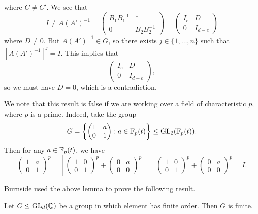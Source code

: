 \begin{pf}
   where $C \neq C'$. We see that 
   \[ I \neq A(A')^{-1} = \begin{pmatrix}
       B_1B_1^{-1} & * \\ 0 & B_2B_2^{-1} 
   \end{pmatrix} = \begin{pmatrix}
       I_e & D \\ 0 & I_{d-e}
   \end{pmatrix} \] 
   where $D \neq 0$. But $A(A')^{-1} \in G$, so there exists $j \in \{1, \dots, n\}$ 
   such that $[A(A')^{-1}]^j = I$. This implies that 
   \[ \begin{pmatrix}
       I_e & D \\ 0 & I_{d-e}
   \end{pmatrix}, \] 
   so we must have $D = 0$, which is a contradiction.
\end{pf}

We note that this result is false if we are working over a field of characteristic 
$p$, where $p$ is a prime. Indeed, take the group 
\[ G = \left\{ \begin{pmatrix}
    1 & a \\ 0 & 1 
\end{pmatrix} : a \in \mathbb{F}_p(t)\right\} \leq \operatorname{GL}_2(\mathbb{F}_p(t)). \] 
Then for any $a \in \mathbb{F}_p(t)$, we have 
\[ \begin{pmatrix}
    1 & a \\ 0 & 1 
\end{pmatrix}^{\!p} = \left[ \begin{pmatrix}
    1 & 0 \\ 0 & 1 
\end{pmatrix}^{\!p} + \begin{pmatrix}
    0 & a \\ 0 & 0 
\end{pmatrix}^{\!p} \right] = \begin{pmatrix}
    1 & 0 \\ 0 & 1 
\end{pmatrix}^{\!p} + \begin{pmatrix}
    0 & a \\ 0 & 0
\end{pmatrix}^{\!p} = I. \] 

Burnside used the above lemma to prove the following result. 

\begin{theo}[Burnside]{}
    Let $G \leq \operatorname{GL}_d(\mathbb{Q})$ be a group in which element has finite order. 
    Then $G$ is finite. 
\end{theo}

